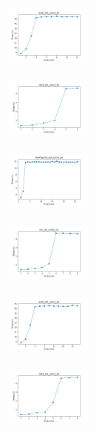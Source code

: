 \begin{figure}[H]
\begin{subfigure}
        \centering
        \includegraphics[width=0.234\textwidth]{img/es/ecoli_set_const_20_589741062_time.png}
    \end{subfigure}
    \hfill
    \begin{subfigure}
        \centering
        \includegraphics[width=0.234\textwidth]{img/es/rand_set_const_20_589741062_time.png}
    \end{subfigure}
    \hfill
    \begin{subfigure}
        \centering
        \includegraphics[width=0.234\textwidth]{img/es/newthyroid_set_const_20_589741062_time.png}
    \end{subfigure}
    \hfill
    \begin{subfigure}
        \centering
        \includegraphics[width=0.234\textwidth]{img/es/iris_set_const_20_277451237_time.png}
    \end{subfigure}
    \hfill
    \begin{subfigure}
        \centering
        \includegraphics[width=0.234\textwidth]{img/es/ecoli_set_const_20_277451237_time.png}
    \end{subfigure}
    \hfill
    \begin{subfigure}
        \centering
        \includegraphics[width=0.234\textwidth]{img/es/rand_set_const_20_277451237_time.png}

\end{subfigure}
\end{figure}
